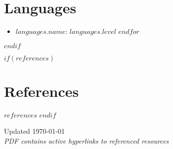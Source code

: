 \documentclass[10.5pt,a4paper]{article}
\newenvironment{entryDetails}{%
  \begin{itemize}[leftmargin=*, itemsep=1pt, topsep=1pt, parsep=0pt]
}{%
  \end{itemize}
  \vspace{-0.1cm}
}
\begin{document}
\section*{Languages}
\begin{entryDetails}
	$for(languages)$
	\item \textbf{$languages.name$}: $languages.level$
	$endfor$
\end{entryDetails}
$endif$

$if(references)$
\section*{References}
$references$
$endif$

\vfill
\begin{center}
	\footnotesize{Updated \today \\ \textit{PDF contains active hyperlinks to referenced resources}}
\end{center}
\end{document}
